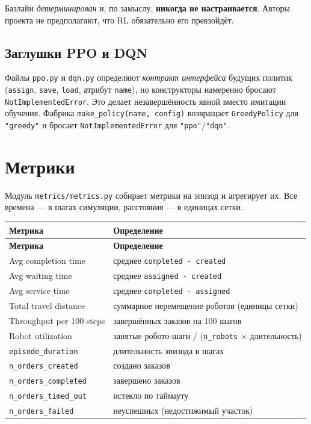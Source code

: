 \documentclass[11pt,a4paper]{article}
\newcommand{\code}[1]{\texttt{#1}}
\begin{document}
Базлайн \emph{детерминирован} и, по замыслу, \textbf{никогда не настраивается}.
Авторы проекта не предполагают, что RL обязательно его превзойдёт.

\subsection{Заглушки PPO и DQN}
Файлы \code{ppo.py} и \code{dqn.py} определяют \emph{контракт интерфейса}
будущих политик (\code{assign}, \code{save}, \code{load}, атрибут \code{name}),
но конструкторы намеренно бросают \code{NotImplementedError}. Это делает
незавершённость явной вместо имитации обучения. Фабрика
\code{make\_policy(name, config)} возвращает \code{GreedyPolicy} для
\code{"greedy"} и бросает \code{NotImplementedError} для \code{"ppo"}/\code{"dqn"}.

\section{Метрики}
Модуль \code{metrics/metrics.py} собирает метрики на эпизод и агрегирует их.
Все времена — в шагах симуляции, расстояния — в единицах сетки.

\begin{longtable}{@{}p{}p{}@{}}
\toprule
\textbf{Метрика} & \textbf{Определение} \\
\midrule
\endfirsthead
\toprule
\textbf{Метрика} & \textbf{Определение} \\
\midrule
\endhead
Avg completion time & среднее \code{completed - created} \\
Avg waiting time & среднее \code{assigned - created} \\
Avg service time & среднее \code{completed - assigned} \\
Total travel distance & суммарное перемещение роботов (единицы сетки) \\
Throughput per 100 steps & завершённых заказов на 100 шагов \\
Robot utilization & занятые робото-шаги / (\code{n\_robots} $\times$ длительность) \\
\code{episode\_duration} & длительность эпизода в шагах \\
\code{n\_orders\_created} & создано заказов \\
\code{n\_orders\_completed} & завершено заказов \\
\code{n\_orders\_timed\_out} & истекло по таймауту \\
\code{n\_orders\_failed} & неуспешных (недостижимый участок) \\
\bottomrule
\end{longtable}
\end{document}
